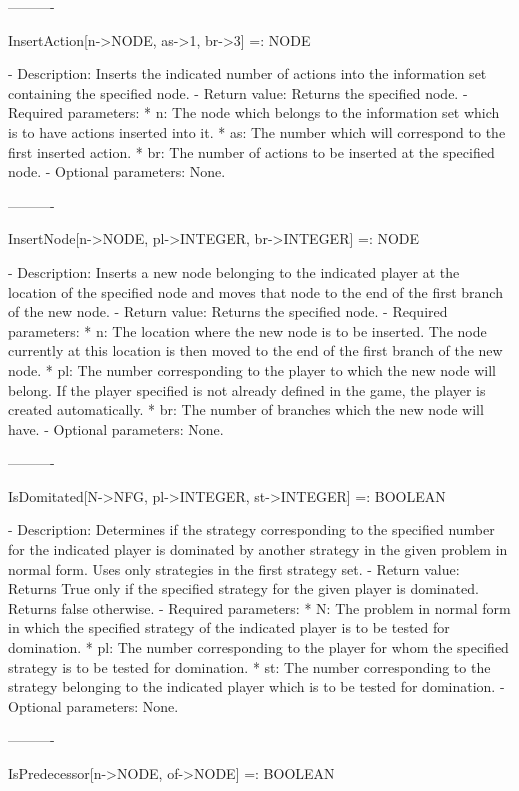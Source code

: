 ----------

InsertAction[n->NODE, as->1, br->3] =: NODE

   -	Description:  Inserts the indicated number of actions into the 
	information set containing the specified node.
   -	Return value:  Returns the specified node.
   -	Required parameters:
	  *  n:  The node which belongs to the information set which is to have
		actions inserted into it.
	  *  as:  The number which will correspond to the first inserted
		action.
	  *  br:  The number of actions to be inserted at the specified node.
   -	Optional parameters:  None.

----------

InsertNode[n->NODE, pl->INTEGER, br->INTEGER] =: NODE

   -	Description:  Inserts a new node belonging to the indicated player at 
	the location of the specified node and moves that node to the end of 
	the first branch of the new node.
   -	Return value:  Returns the specified node.
   -	Required parameters:
	  *  n:  The location where the new node is to be inserted.  The node
		currently at this location is then moved to the end of the 
		first branch of the new node.
	  *  pl:  The number corresponding to the player to which the new node
		will belong.  If the player specified is not already defined in
		the game, the player is created automatically.
	  *  br:  The number of branches which the new node will have.
   -	Optional parameters:  None.

----------

IsDomitated[N->NFG, pl->INTEGER, st->INTEGER] =: BOOLEAN

   -	Description:  Determines if the strategy corresponding to the specified
	number for the indicated player is dominated by another strategy in the
	given problem in normal form.  Uses only strategies in the first 
	strategy set.
   -	Return value:  Returns True only if the specified strategy for the 
	given player is dominated.  Returns false otherwise.
   -	Required parameters:
	  *  N:  The problem in normal form in which the specified strategy of
		the indicated player is to be tested for domination.
	  *  pl:  The number corresponding to the player for whom the specified
		strategy is to be tested for domination.
	  *  st:  The number corresponding to the strategy belonging to the 
		indicated player which is to be tested for domination.
   -	Optional parameters:  None.

----------

IsPredecessor[n->NODE, of->NODE] =: BOOLEAN

